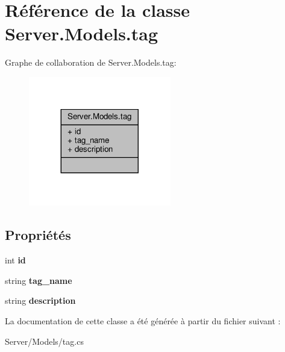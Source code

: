 \hypertarget{class_server_1_1_models_1_1tag}{}\section{Référence de la classe Server.\+Models.\+tag}
\label{class_server_1_1_models_1_1tag}


Graphe de collaboration de Server.\+Models.\+tag\+:\nopagebreak
\begin{figure}[H]
\begin{center}
\leavevmode
\includegraphics[width=176pt]{class_server_1_1_models_1_1tag__coll__graph}
\end{center}
\end{figure}
\subsection*{Propriétés}
\begin{DoxyCompactItemize}
\item 
\mbox{\label{class_server_1_1_models_1_1tag_a3aa3cfdfe3541d6269b3bd21be4608e5}} 
int {\bfseries id}
\item 
\mbox{\label{class_server_1_1_models_1_1tag_a55337a12d2da7c9f2a3a504146b6ab37}} 
string {\bfseries tag\+\_\+name}
\item 
\mbox{\label{class_server_1_1_models_1_1tag_a2db60b27c7f21f735dd0b3fc5ed626fe}} 
string {\bfseries description}
\end{DoxyCompactItemize}


La documentation de cette classe a été générée à partir du fichier suivant \+:\begin{DoxyCompactItemize}
\item 
Server/\+Models/tag.\+cs\end{DoxyCompactItemize}

